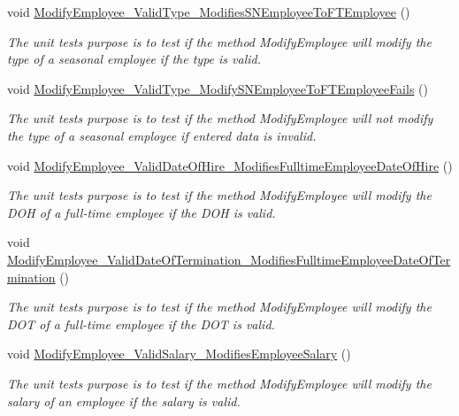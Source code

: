 \begin{DoxyCompactItemize}
void \hyperlink{class_the_company_1_1_tests_1_1_modify_employee_tests_a242a10c30c2995c7a788c31230249e1d}{Modify\+Employee\+\_\+\+Valid\+Type\+\_\+\+Modifies\+S\+N\+Employee\+To\+F\+T\+Employee} ()
\begin{DoxyCompactList}\small\item\em The unit test\textquotesingle{}s purpose is to test if the method Modify\+Employee will modify the type of a seasonal employee if the type is valid. \end{DoxyCompactList}\item 
void \hyperlink{class_the_company_1_1_tests_1_1_modify_employee_tests_a91c6798c773ececd594a529687b6b0f1}{Modify\+Employee\+\_\+\+Valid\+Type\+\_\+\+Modify\+S\+N\+Employee\+To\+F\+T\+Employee\+Fails} ()
\begin{DoxyCompactList}\small\item\em The unit test\textquotesingle{}s purpose is to test if the method Modify\+Employee will not modify the type of a seasonal employee if entered data is invalid. \end{DoxyCompactList}\item 
void \hyperlink{class_the_company_1_1_tests_1_1_modify_employee_tests_a2155a19d89078264cddb17a940b44112}{Modify\+Employee\+\_\+\+Valid\+Date\+Of\+Hire\+\_\+\+Modifies\+Fulltime\+Employee\+Date\+Of\+Hire} ()
\begin{DoxyCompactList}\small\item\em The unit test\textquotesingle{}s purpose is to test if the method Modify\+Employee will modify the D\+O\+H of a full-\/time employee if the D\+O\+H is valid. \end{DoxyCompactList}\item 
void \hyperlink{class_the_company_1_1_tests_1_1_modify_employee_tests_aec6029c72d6d02bc8c7ffe5043c48fc2}{Modify\+Employee\+\_\+\+Valid\+Date\+Of\+Termination\+\_\+\+Modifies\+Fulltime\+Employee\+Date\+Of\+Termination} ()
\begin{DoxyCompactList}\small\item\em The unit test\textquotesingle{}s purpose is to test if the method Modify\+Employee will modify the D\+O\+T of a full-\/time employee if the D\+O\+T is valid. \end{DoxyCompactList}\item 
void \hyperlink{class_the_company_1_1_tests_1_1_modify_employee_tests_a68b5b417317f2f695b04897aba437686}{Modify\+Employee\+\_\+\+Valid\+Salary\+\_\+\+Modifies\+Employee\+Salary} ()
\begin{DoxyCompactList}\small\item\em The unit test\textquotesingle{}s purpose is to test if the method Modify\+Employee will modify the salary of an employee if the salary is valid. \end{DoxyCompactList}\item 

\end{DoxyCompactItemize}
